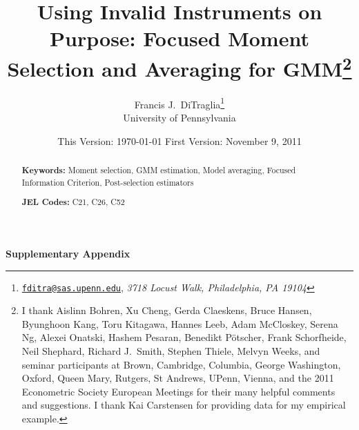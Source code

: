 \documentclass[12pt]{article}
\begin{document}
\title{Using Invalid Instruments on Purpose: Focused Moment Selection and Averaging for GMM\footnote{I thank Aislinn Bohren, Xu Cheng, Gerda Claeskens, Bruce Hansen, Byunghoon Kang, Toru Kitagawa, Hannes Leeb, Adam McCloskey, Serena Ng, Alexei Onatski, Hashem Pesaran, Benedikt P\"{o}tscher, Frank Schorfheide, Neil Shephard, Richard J.\ Smith, Stephen Thiele, Melvyn Weeks, and seminar participants at 
Brown, Cambridge, Columbia, George Washington, Oxford, Queen Mary, Rutgers, St Andrews, UPenn, Vienna, and the 2011 Econometric Society European Meetings for their many helpful comments and suggestions. I thank Kai Carstensen for providing data for my empirical example.}}

\author{Francis J.\ DiTraglia\footnote{
\href{mailto:fditra@sas.upenn.edu}{\texttt{fditra@sas.upenn.edu}}, \emph{3718 Locust Walk, Philadelphia, PA 19104}}
 \\ University of Pennsylvania}

\date{\footnotesize This Version: \today \hspace{0.5em} First Version: November 9, 2011}

\maketitle 
\begin{abstract}
	

	\bigskip
	\noindent\textbf{Keywords:} Moment selection, GMM estimation, Model averaging, Focused Information Criterion, Post-selection estimators

	\medskip
	\noindent\textbf{JEL Codes:} C21, C26, C52 
\end{abstract}



















\small


\appendix
\normalsize
\clearpage
{}%
\renewcommand*{\thepage}{A-\arabic{page}}

\begin{center}
  {\Huge \textbf{Supplementary Appendix}}
\end{center}









%
\end{document}

